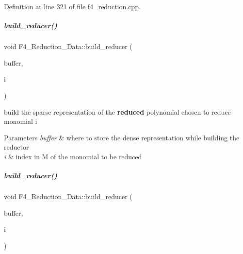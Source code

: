 Definition at line 321 of file f4\+\_\+reduction.\+cpp.

\mbox{\label{group___g_b_computation_aadda8de768e8a8c504979be7425f85ac}} 
\subparagraph{\texorpdfstring{build\+\_\+reducer()}{build\_reducer()}\hspace{0.1cm}{\footnotesize\ttfamily [1/2]}}
{\footnotesize\ttfamily void F4\+\_\+\+Reduction\+\_\+\+Data\+::build\+\_\+reducer (\begin{DoxyParamCaption}\item[{vector$<$ C\+O\+E\+F\+\_\+\+T\+Y\+PE $>$ \&}]{buffer,  }\item[{unsigned}]{i }\end{DoxyParamCaption})\hspace{0.3cm}{\ttfamily [protected]}}



build the sparse representation of the {\bfseries reduced} polynomial chosen to reduce monomial {\ttfamily i} 


\begin{DoxyParams}{Parameters}
{\em buffer} & where to store the dense representation while building the reductor \\
\hline
{\em i} & index in {\ttfamily M} of the monomial to be reduced \\
\hline
\end{DoxyParams}
\mbox{\label{group___g_b_computation_aadda8de768e8a8c504979be7425f85ac}} 
\subparagraph{\texorpdfstring{build\+\_\+reducer()}{build\_reducer()}\hspace{0.1cm}{\footnotesize\ttfamily [2/2]}}
{\footnotesize\ttfamily void F4\+\_\+\+Reduction\+\_\+\+Data\+::build\+\_\+reducer (\begin{DoxyParamCaption}\item[{vector$<$ C\+O\+E\+F\+\_\+\+T\+Y\+PE $>$ \&}]{buffer,  }\item[{unsigned}]{i }\end{DoxyParamCaption})\hspace{0.3cm}{\ttfamily [protected]}}



